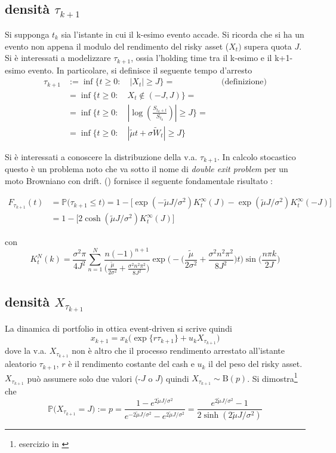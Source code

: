 \documentclass[12pt,a4paper]{article}
\theoremstyle{break}
\begin{document}
\subsection{densità $\tau_{k+1}$}
Si supponga $t_k$ sia l'istante in cui il k-esimo evento accade. Si ricorda che si ha un evento non appena il modulo del rendimento del risky asset ($X_t)$  supera quota $J$. Si è interessati a modelizzare  $\tau_{k+1}$, ossia l'holding time tra il k-esimo e il k+1-esimo evento. In particolare, si definisce il seguente tempo d'arresto
\begin{align*}
\tau_{k+1} & := \inf\{t\geq 0 : \quad |X_t| \geq J \} = && \text{(definizione)}\\
& = \inf\{t\geq 0 : \quad X_t \notin (-J,J) \} = \\
& = \inf\{t\geq 0 : \quad |\log(\frac{S_{t_k + t}}{S_{t_k}})| \geq J \} =\\
& = \inf\{t\geq 0 : \quad |\tilde{\mu} t + \sigma \widetilde{W}_t| \geq J \}
\end{align*}


Si è interessati a conoscere la distribuzione della v.a. $\tau_{k+1}$. In calcolo stocastico questo è un problema noto che va sotto il nome di  \textit{double exit problem} per un moto Browniano con drift. (\cite{PassTime}) fornisce il seguente fondamentale risultato :

\begin{align*}
F_{\tau_{k+1}}(t) & = \mathbb{P}\Big(\tau_{k+1}\leq t \Big) = 1 - \big[ \exp(-\tilde{\mu}J / \sigma^2) K_t^\infty(J) - \exp(\tilde{\mu}J / \sigma^2) K_t^\infty(-J)\big] \\
& = 1-\big[2\cosh(\tilde{\mu}J / \sigma^2)K_t^\infty(J)\big]
\end{align*}

con
\[
K_t^N(k) = \frac{\sigma^2\pi}{4J^2}\sum_{n=1}^{N}\frac{n(-1)^{n+1}}{\big(\frac{\tilde{\mu}}{2\sigma^2} + \frac{\sigma^2n^2\pi^2}{8J^2}\big)}\exp\Big(-\big(\frac{\tilde{\mu}}{2\sigma^2} + \frac{\sigma^2n^2\pi^2}{8J^2}\big)t\Big) \sin\big(\frac{n\pi k}{2J}\big)
\]

\subsection{densità $X_{\tau_{k+1}}$}
La dinamica di portfolio in ottica event-driven si scrive quindi
\begin{equation}\label{ptfDyn}
\boxed{x_{k+1} = x_k \big(\exp\{r \tau_{k+1}\} + u_k X_{\tau_{k+1}}\big)}
\end{equation}
dove la v.a. $X_{\tau_{k+1}}$ non è altro che il processo rendimento arrestato all'istante aleatorio $\tau_{k+1}$, $r$ è il rendimento costante del cash e $u_k$ il del peso del risky asset.
$X_{\tau_{k+1}}$ può assumere solo due valori (-$J$ o $J$) quindi $X_{\tau_{k+1}} \sim \text{B}(p)$. Si dimostra\footnote{esercizio in \cite{Baldi}} che
\begin{equation}
\mathbb{P}\Big(X_{\tau_{k+1}} = J\Big) := p = \frac{1-e^{2\tilde{\mu}J/\sigma^2}}{e^{-2\tilde{\mu}J/\sigma^2} - e^{2\tilde{\mu}J/\sigma^2}} = \frac{e^{2\tilde{\mu}J/\sigma^2}-1}{2\sinh(2\tilde{\mu}J/\sigma^2)}
\end{equation}
\end{document}
